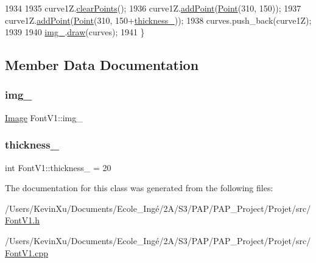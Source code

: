 \begin{DoxyCode}
1934 
1935     curve1Z.\mbox{\hyperlink{class_bezier_curve_a0ba8ce66d5af5971ae6a1b506029728e}{clearPoints}}();
1936     curve1Z.\mbox{\hyperlink{class_bezier_curve_a38d16c18b36ae45619b05e26e226cf34}{addPoint}}(\mbox{\hyperlink{class_point}{Point}}(310, 150));
1937     curve1Z.\mbox{\hyperlink{class_bezier_curve_a38d16c18b36ae45619b05e26e226cf34}{addPoint}}(\mbox{\hyperlink{class_point}{Point}}(310, 150+\mbox{\hyperlink{class_font_v1_aed8040e76be9a52833627b92f0fb4e5f}{thickness\_}}));
1938     curves.push\_back(curve1Z);
1939 
1940     \mbox{\hyperlink{class_font_v1_a00569e3e3c4b70f437b63f396f735fb0}{img\_}}.\mbox{\hyperlink{class_image_a8d162f3cab956131d58708c09aa560b0}{draw}}(curves);
1941 \}
\end{DoxyCode}


\subsection{Member Data Documentation}
\mbox{\label{class_font_v1_a00569e3e3c4b70f437b63f396f735fb0}} 
\subsubsection{\texorpdfstring{img\+\_\+}{img\_}}
{\footnotesize\ttfamily \mbox{\hyperlink{class_image}{Image}} Font\+V1\+::img\+\_\+\hspace{0.3cm}{\ttfamily [protected]}}

\mbox{\label{class_font_v1_aed8040e76be9a52833627b92f0fb4e5f}} 
\subsubsection{\texorpdfstring{thickness\+\_\+}{thickness\_}}
{\footnotesize\ttfamily int Font\+V1\+::thickness\+\_\+ = 20\hspace{0.3cm}{\ttfamily [protected]}}



The documentation for this class was generated from the following files\+:\begin{DoxyCompactItemize}
\item 
/\+Users/\+Kevin\+Xu/\+Documents/\+Ecole\+\_\+\+Ingé/2\+A/\+S3/\+P\+A\+P/\+P\+A\+P\+\_\+\+Project/\+Projet/src/\mbox{\hyperlink{_font_v1_8h}{Font\+V1.\+h}}\item 
/\+Users/\+Kevin\+Xu/\+Documents/\+Ecole\+\_\+\+Ingé/2\+A/\+S3/\+P\+A\+P/\+P\+A\+P\+\_\+\+Project/\+Projet/src/\mbox{\hyperlink{_font_v1_8cpp}{Font\+V1.\+cpp}}\end{DoxyCompactItemize}
